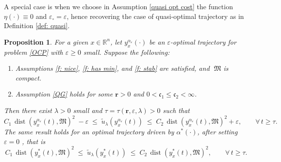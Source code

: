 \documentclass[12pt]{amsart}
\numberwithin{equation}{section}
\theoremstyle{plain}
\newtheorem{proposition}[theorem]{Proposition}
\begin{document}
A special case  is when we choose in Assumption \ref{quasi opt cost} the function $\eta(\cdot)\equiv 0$ and $\varepsilon_{\circ}=\varepsilon$, hence recovering the case of quasi-optimal trajectory as in Definition \ref{def: quasi}. 
\begin{proposition}
For a given $x\in\mathbb{R}^{n}$, let $y_{x}^{\alpha_{\varepsilon}}(\cdot)$ be an $\varepsilon$-optimal trajectory for problem \eqref{OCP} with $\varepsilon\geq 0$ small. 
Suppose the following: 
\begin{enumerate}[label = -]
    \item Assumptions \ref{f: nice}, \ref{f: has min}, and \ref{f: stab} are satisfied, and $\;\mathfrak{M}$ is compact. 
    \item Assumption \ref{QG} holds for some $\mathbf{r}>0$ and $0<\mathfrak{c}_{1}\leq \mathfrak{c}_{2}<\infty$.
\end{enumerate}
Then there exist $\lambda>0$ small and $\tau = \tau(\mathbf{r},\varepsilon, \lambda)>0$ such that %
\begin{equation*}
    C_{1}\,\operatorname{dist}(y_{x}^{\alpha_{\varepsilon}}(t),\mathfrak{M})^{2} \; -\varepsilon\; 
    \leq \; \tilde{u}_{\lambda}(y_{x}^{\alpha_{\varepsilon}}(t))  \; 
    \leq \; C_{2}\,\operatorname{dist}(y_{x}^{\alpha_{\varepsilon}}(t),\mathfrak{M})^{2} + \varepsilon ,\quad\quad \forall\,t\geq\tau.
\end{equation*}
The same result holds for an optimal trajectory driven by $\alpha^{*}(\cdot)$, after setting $\varepsilon=0$ , that is
\begin{equation*}
    C_{1}\,\operatorname{dist}(y_{x}^{*}(t),\mathfrak{M})^{2} \; \leq \; \tilde{u}_{\lambda}(y_{x}^{*}(t))\; \leq \; C_{2}\,\operatorname{dist}(y_{x}^{*}(t),\mathfrak{M})^{2}, \quad\quad \forall\,t\geq\tau.
\end{equation*}
\end{proposition}
\end{document}
